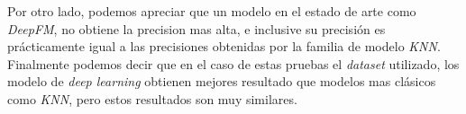 \documentclass[11pt,a4paper,twoside]{thesis}
\begin{document}
Por otro lado, podemos apreciar que un modelo en el estado de arte como
\textit{DeepFM}, no obtiene la precision mas alta, e inclusive su precisión es
prácticamente igual a las precisiones obtenidas por la familia de modelo
\textit{KNN}. Finalmente podemos decir que en el caso de estas pruebas el
\textit{dataset} utilizado, los modelo de \textit{deep learning} obtienen
mejores resultado que modelos mas clásicos como \textit{KNN}, pero estos
resultados son muy similares.



\renewcommand{\bibname}{Referencias}
\end{document}
